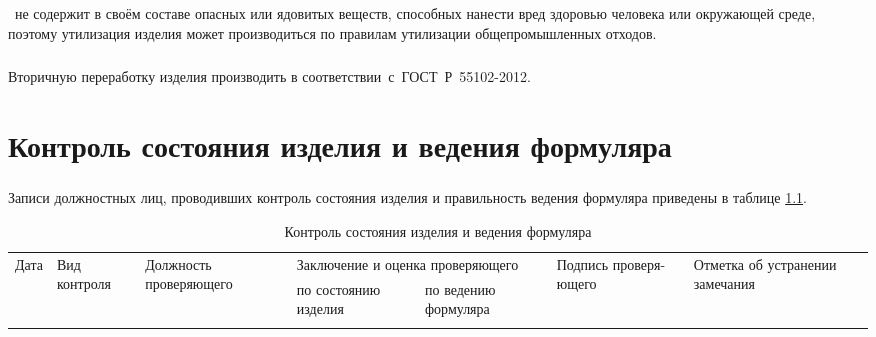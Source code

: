 \paragraph{} \devName\ не содержит в своём составе опасных или ядовитых веществ, способных нанести вред здоровью человека или окружающей среде, поэтому утилизация изделия может производиться по правилам утилизации
общепромышленных отходов.

\paragraph{} Вторичную переработку изделия производить в соответствии~с~ГОСТ~Р~55102-2012.

\chapter{Контроль состояния изделия и ведения формуляра}


\paragraph{} Записи должностных лиц, проводивших контроль состояния изделия и правильность ведения формуляра приведены в таблице \ref{tab:control}.

	\begin{small}
	\begin{longtable}{|p{1cm}|p{2cm}|p{3cm}|p{2cm}|p{2cm}|p{2.5cm}|p{2.2cm}|}
		\caption{\label{tab:control} Контроль состояния изделия и ведения формуляра}\\ \hline
		\multirow{2}{1cm}{Дата} & \multirow{2}{2cm}{Вид контроля} & \multirow{2}{3cm}{Должность проверяющего} & \multicolumn{2}{p{4cm}|}{Заключение и оценка проверяющего} & \multirow{2}{2cm}{Подпись проверя- ющего} & \multirow{2}{2.2cm}{Отметка об устранении замечания} \\ \cline{4-5}
		&  &  & по состоянию изделия & по ведению формуляра &  &  \\ \hline
		
 		\rule{0cm}{17cm}& & & & & & \\\hline
	\end{longtable}
	\end{small}

